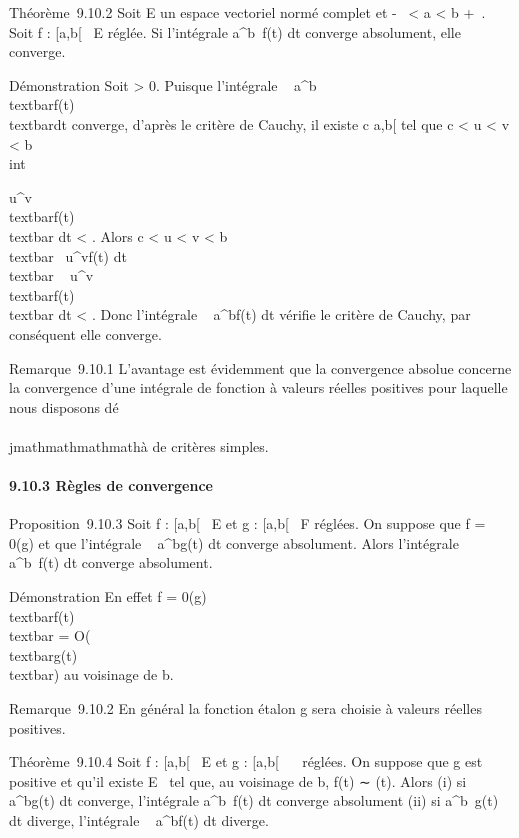 Théorème~9.10.2 Soit E un espace vectoriel normé complet et -\infty~
\textless{} a \textless{} b \leq +\infty~. Soit f : {[}a,b{[}\rightarrow~ E réglée. Si
l'intégrale \int  a^b~f(t) dt
converge absolument, elle converge.

Démonstration Soit \epsilon \textgreater{} 0. Puisque l'intégrale
\int ~
a^b\\textbar{}f(t)\\textbar{}dt
converge, d'après le critère de Cauchy, il existe c \in {[}a,b{[} tel que
c \textless{} u \textless{} v \textless{} b \rigtharrow~\\int

u^v\\textbar{}f(t)\\textbar{}
dt \textless{} \epsilon. Alors c \textless{} u \textless{} v \textless{} b
\rigtharrow~\\textbar{}\int ~
u^vf(t) dt\\textbar{}
\leq\int ~
u^v\\textbar{}f(t)\\textbar{}
dt \textless{} \epsilon. Donc l'intégrale \int ~
a^bf(t) dt vérifie le critère de Cauchy, par conséquent
elle converge.

Remarque~9.10.1 L'avantage est évidemment que la convergence absolue
concerne la convergence d'une intégrale de fonction à valeurs réelles
positives pour laquelle nous disposons dé\\\\jmathmathmathmathà de critères simples.

\paragraph{9.10.3 Règles de convergence}

Proposition~9.10.3 Soit f : {[}a,b{[}\rightarrow~ E et g : {[}a,b{[}\rightarrow~ F réglées. On
suppose que f = 0(g) et que l'intégrale \int ~
a^bg(t) dt converge absolument. Alors l'intégrale
\int  a^b~f(t) dt converge
absolument.

Démonstration En effet f = 0(g) \Leftrightarrow
\\textbar{}f(t)\\textbar{} =
O(\\textbar{}g(t)\\textbar{}) au voisinage
de b.

Remarque~9.10.2 En général la fonction étalon g sera choisie à valeurs
réelles positives.

Théorème~9.10.4 Soit f : {[}a,b{[}\rightarrow~ E et g : {[}a,b{[}\rightarrow~ ~ réglées. On
suppose que g est positive et qu'il existe \ell \in E
\diagdown\0\ tel que, au voisinage de b, f(t)
∼ \ellg(t). Alors (i) si \int ~
a^bg(t) dt converge, l'intégrale
\int  a^b~f(t) dt converge
absolument (ii) si \int  a^b~g(t)
dt diverge, l'intégrale \int ~
a^bf(t) dt diverge.

